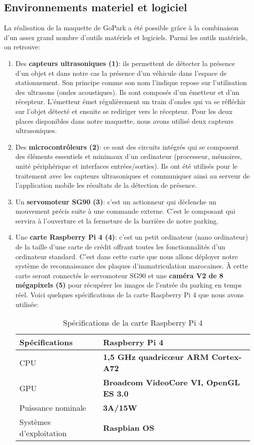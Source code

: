     \subsection{Environnements materiel et logiciel}
    La réalisation de la maquette de GoPark a été possible grâce à la combinaison d’un assez grand nombre d’outils matériels et logiciels. Parmi les outils matériels, on retrouve:
    \begin{enumerate}
        \item Des \textbf{capteurs ultrasoniques (1)}: ils permettent de détecter la présence d’un objet et dans notre cas la présence d’un véhicule dans l’espace de stationnement. Son principe comme son nom l’indique repose sur l’utilisation des ultrasons (ondes acoustiques). Ils sont composés d’un émetteur et d’un récepteur. L’émetteur émet régulièrement un train d’ondes qui va se réfléchir sur l’objet détecté et ensuite se rediriger vers le récepteur. Pour les deux places disponibles dans notre maquette, nous avons utilisé deux capteurs ultrasoniques.
        \item Des \textbf{microcontrôleurs (2)}: ce sont des circuits intégrés qui se composent des éléments essentiels et minimaux d’un ordinateur (processeur, mémoires, unité périphérique et interfaces entrées/sorties). Ils ont été utilisés pour le traitement avec les capteurs ultrasoniques et communiquer ainsi au serveur de l’application mobile les résultats de la détection de présence.
        \item Un \textbf{servomoteur SG90 (3)}:  c’est un actionneur qui déclenche un mouvement précis suite à une commande externe. C’est le composant qui servira à l’ouverture et la fermeture de la barrière de notre parking.
        \item Une \textbf{carte Raspberry Pi 4 (4)}: c'est un petit ordinateur (nano ordinateur) de la taille d'une carte de crédit offrant toutes les fonctionnalités d’un ordinateur standard. C’est dans cette carte que nous allons déployer notre système de reconnaissance des plaques d’immatriculation marocaines. À cette carte seront connectés le servomoteur SG90 et une \textbf{caméra V2 de 8 mégapixels (5)} pour récupérer les images de l’entrée du parking en temps réel. Voici quelques spécifications de la carte Raspberry Pi 4 que nous avons utilisée:
        \begin{table}[H]
            \centering
            \begin{tabular}{|l|l|}
                \hline
                \rowcolor{Gray}
                \textbf{Spécifications} & \textbf{Raspberry Pi 4} \\ \hline
                CPU & \textbf{1,5 GHz quadricœur ARM Cortex-A72} \\ \hline
                GPU & \textbf{Broadcom VideoCore VI, OpenGL ES 3.0} \\ \hline
                Puissance nominale  & \textbf{3A/15W} \\ \hline
                Systèmes d’exploitation & \textbf{Raspbian OS} \\ \hline
            \end{tabular}
            \caption{Spécifications de la carte Raspberry Pi 4}
        \end{table}
    \end{enumerate}
